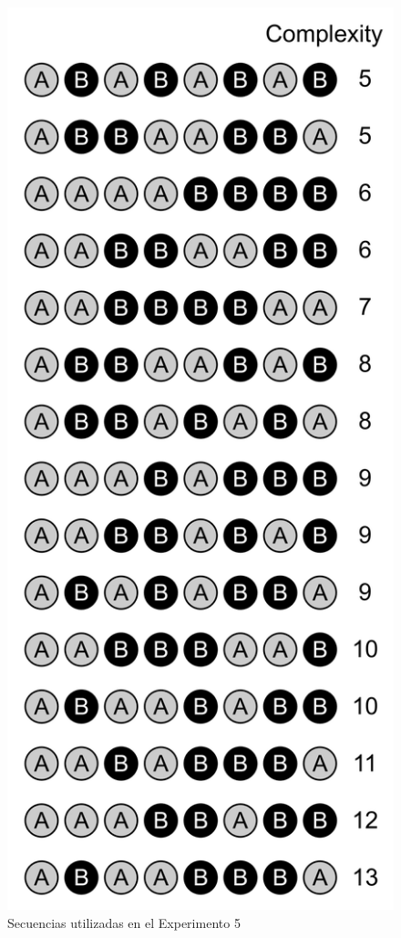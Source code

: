 \begin{figure}[t!]
      \includegraphics[scale=0.8]{figuras/plosbio/journal.pcbi.1008598.s007.png}
      \centering
      \caption{Secuencias utilizadas en el Experimento 5}
      \label{PlosBIO-S7}
\end{figure}

